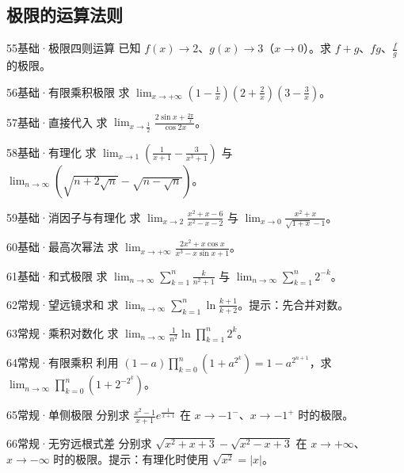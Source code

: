 \subsection{极限的运算法则}
\begin{exercise}{55}{基础·极限四则运算}
已知 $f(x)\to2$、$g(x)\to3$（$x\to0$）。求 $f+g$、$fg$、$\frac{f}{g}$ 的极限。
\end{exercise}
\begin{exercise}{56}{基础·有限乘积极限}
求 $\lim_{x\to+\infty}(1-\frac{1}{x})(2+\frac{2}{x})(3-\frac{3}{x})$。
\end{exercise}
\begin{exercise}{57}{基础·直接代入}
求 $\lim_{x\to\frac{1}{2}}\frac{2\sin x+\frac{2\pi}{x}}{\cos2x}$。
\end{exercise}
\begin{exercise}{58}{基础·有理化}
求 $\lim_{x\to1}(\frac{1}{x+1}-\frac{3}{x^3+1})$ 与 $\lim_{n\to\infty}(\sqrt{n+2\sqrt n}-\sqrt{n-\sqrt n})$。
\end{exercise}
\begin{exercise}{59}{基础·消因子与有理化}
求 $\lim_{x\to2}\frac{x^2+x-6}{x^2-x-2}$ 与 $\lim_{x\to0}\frac{x^2+x}{\sqrt{1+x}-1}$。
\end{exercise}
\begin{exercise}{60}{基础·最高次幂法}
求 $\lim_{x\to+\infty}\frac{2x^2+x\cos x}{x^3-x\sin x+1}$。
\end{exercise}
\begin{exercise}{61}{基础·和式极限}
求 $\lim_{n\to\infty}\sum_{k=1}^n\frac{k}{n^2+1}$ 与 $\lim_{n\to\infty}\sum_{k=1}^n2^{-k}$。
\end{exercise}
\begin{exercise}{62}{常规·望远镜求和}
求 $\lim_{n\to\infty}\sum_{k=1}^n\ln\frac{k+1}{k+2}$。提示：先合并对数。
\end{exercise}
\begin{exercise}{63}{常规·乘积对数化}
求 $\lim_{n\to\infty}\frac1{n^2}\ln\prod_{k=1}^n2^k$。
\end{exercise}
\begin{exercise}{64}{常规·有限乘积}
利用 $(1-a)\prod_{k=0}^n(1+a^{2^k})=1-a^{2^{n+1}}$，求 $\lim_{n\to\infty}\prod_{k=0}^n(1+2^{-2^k})$。
\end{exercise}
\begin{exercise}{65}{常规·单侧极限}
分别求 $\frac{x^2-1}{x+1}e^{\frac{1}{x+1}}$ 在 $x\to-1^-$、$x\to-1^+$ 时的极限。
\end{exercise}
\begin{exercise}{66}{常规·无穷远根式差}
分别求 $\sqrt{x^2+x+3}-\sqrt{x^2-x+3}$ 在 $x\to+\infty$、$x\to-\infty$ 时的极限。提示：有理化时使用 $\sqrt{x^2}=|x|$。
\end{exercise}
